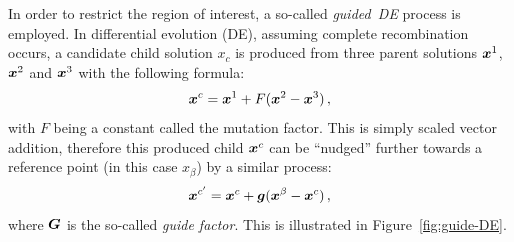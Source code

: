 \documentclass[journal]{IEEEtran}
\begin{document}
In order to restrict the region of interest, a so-called \emph{guided~DE} process is employed. In differential evolution (DE), assuming complete recombination occurs, a candidate child solution $x_c$ is produced from three parent solutions $\boldsymbol{x}^1$, $\boldsymbol{x}^2$ and $\boldsymbol{x}^3$ with the following formula:
\begin{equation}
\boldsymbol{x}^c = \boldsymbol{x}^1 + F(\boldsymbol{x}^2 - \boldsymbol{x}^3)\,,
\end{equation}
with $F$ being a constant called the mutation factor. This is simply scaled vector addition, therefore this produced child $\boldsymbol{x}^c$ can be ``nudged'' further towards a reference point (in this case $x_\beta$) by a similar process:
\begin{equation}\label{eq:nudge}
\boldsymbol{x}^{c'} = \boldsymbol{x}^c + \boldsymbol{g}(\boldsymbol{x}^\beta - \boldsymbol{x}^c)\,,
\end{equation}
where $\boldsymbol{G}$ is the so-called \emph{guide factor}. This is illustrated in Figure~\ref{fig:guide-DE}.
\end{document}

